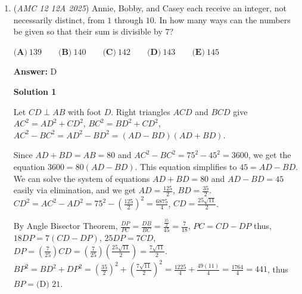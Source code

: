 \begin{enumerate}
As all of the above solutions point out, the set $\{11, ..., 20\}$ satisfies the required condition, and so the greatest size of a sum-free set is no less than 10. How do we know that 11 isn't possible? Induction is our friend here. 

 We want to prove that the set $\{1, ..., 2n\}$ has a sum-free set of size no more than $n$. It is obvious for $n=1$. Suppose it is true for $n-1$. Now let $S$ be a sum-free subset of $\{1, ..., 2n\}$ and that it has at least $n+1$ elements. The intersection of $S$ and $\{1, ..., 2n-2\}$ is sum-free, so it has no more than $n-1$ elements. So we must include both $2n-1$ and $2n$ into $S$. If so, then $1$ and $n$ cannot belong to $S$. 

 We are now searching for $n-1$ more elements. But we can make $n-2$ 'pigeonholes': $\{2, 2n-2\}, \{3, 2n-3\}, ..., \{n-1, n+1\}$, seeing that they can provide no more than $n-2$ elements because each pigeonhole will have a sum of $2n$.

 


 


	\item (\textit{AMC 12 12A 2025}) Annie, Bobby, and Casey each receive an integer, not necessarily distinct, from $1$ through $10$. In how many ways can the numbers be given so that their sum is divisible by $7$?


 $\textbf{(A)}\   139  \qquad                  \textbf{(B)}\   140  \qquad                 \textbf{(C)}\   142  \qquad                 \textbf{(D)}\   143  \qquad                 \textbf{(E)}\   145$

 \textbf{Answer: }D



\textbf{Solution 1}

Let $CD \perp AB$ with foot $D$. Right triangles $ACD$ and $BCD$ give $AC^2 = AD^2+CD^2$, $BC^2 = BD^2+CD^2$, $AC^2-BC^2 = AD^2-BD^2 =(AD-BD)(AD+BD)$. 

 Since $AD+BD = AB = 80$ and $AC^2-BC^2 = 75^2-45^2 = 3600$, we get the equation $3600 = 80(AD-BD)$. This equation simplifies to $45 = AD - BD$. We can solve the system of equations $AD + BD = 80$ and $AD - BD = 45$ easily via elimination, and we get $AD = \frac{125}{2}$, $BD = \frac{35}{2}$. $CD^2 = AC^2-AD^2 = 75^2-\left(\frac{125}{2}\right)^2 = \frac{6875}{4}$, $CD = \frac{25\sqrt{11}}{2}$. 

 By Angle Bisector Theorem, $\frac{DP}{PC} = \frac{DB}{BC} = \frac{\frac{35}{2}}{45} = \frac{7}{18}$, $PC = CD-DP$ thus, $18DP = 7(CD-DP)$, $25DP = 7CD$, $DP = \left(\frac{7}{25}\right)CD = \left(\frac{7}{25}\right)\left(\frac{25\sqrt{11}}{2}\right) = \frac{7\sqrt{11}}{2}$. $BP^2 = BD^2+DP^2 = \left(\frac{35}{2}\right)^2+\left(\frac{7\sqrt{11}}{2}\right)^2 = \frac{1225}{4}+\frac{49(11)}{4} = \frac{1764}{4} = 441$, thus $BP = \boxed{\text{(D) }21}.$





\end{enumerate}
